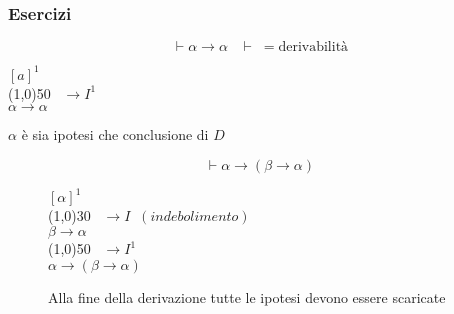 \documentclass{article}
\theoremstyle{break}
\theoremstyle{break}
\theoremstyle{break}
\theoremstyle{break}
\begin{document}
\subsubsection{Esercizi}
\begin{exercise}
  \[
    \vdash \alpha \to \alpha \;\;\; \vdash\; = \text{derivabilità}
  \] 
  \begin{center}
    \(
    [a]^1
    \)\\
    \hspace{1cm}\line(1,0){50}\(\;\;\; \to I^1 \)\\  
    \(
    \alpha \to \alpha
    \) 
  \end{center}
  \( \alpha \) è sia ipotesi che conclusione di \( D \) 
\end{exercise}
\begin{figure}[H]
  \begin{exercise}
    \[
      \vdash \alpha \to (\beta \to \alpha)
    \] 
    \begin{center}
      \(
      [\alpha]^1
      \)\\
      \hspace{3.6cm}\line(1,0){30}\(\;\;\; \to I\;\; (indebolimento) \)\\  
      \( \beta \to \alpha \) \\
      \hspace{1cm}\line(1,0){50}\(\;\;\; \to I^1 \)\\  
      \(
      \alpha \to (\beta \to \alpha)
      \)
    \end{center}
    Alla fine della derivazione tutte le ipotesi devono essere scaricate
  \end{exercise}
\end{figure}
\end{document}

